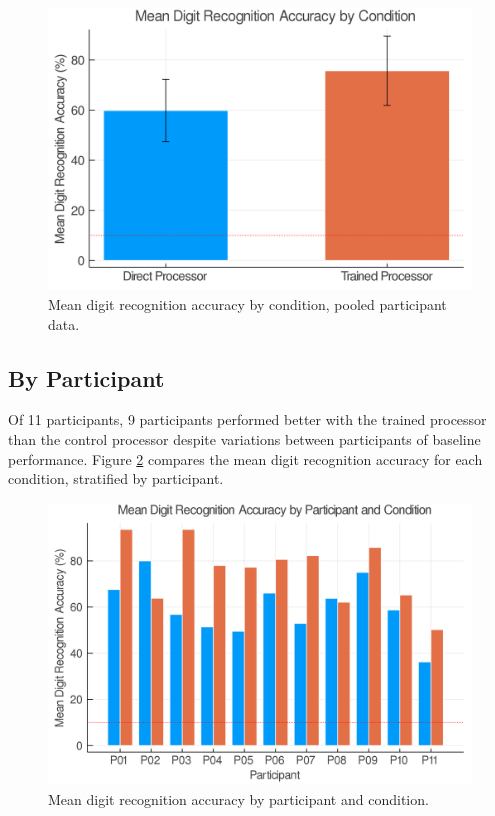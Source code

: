 \documentclass[a4paper,11pt,openany]{book}
\begin{document}
\begin{figure}[htbp]
\centering
\includegraphics[width=.9\linewidth]{./images/results_mean_accuracy_overall.png}
\caption{\label{fig:org18bcdbe}
Mean digit recognition accuracy by condition, pooled participant data.}
\end{figure}


\subsection*{By Participant}
\label{sec:orgec1a690}

Of 11 participants, 9 participants performed better with the trained processor than the control processor despite variations between participants of baseline performance.
Figure \ref{fig:orgdacd8d6} compares the mean digit recognition accuracy for each condition, stratified by participant.

\begin{figure}[htbp]
\centering
\includegraphics[width=.9\linewidth]{./images/results_mean_accuracy_by_participant.png}
\caption{\label{fig:orgdacd8d6}
Mean digit recognition accuracy by participant and condition.}
\end{figure}
\end{document}
